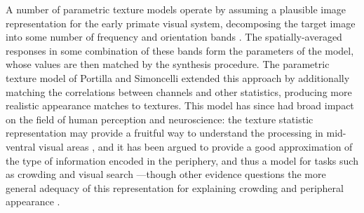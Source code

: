 \documentclass[doc, 11pt,a4paper,natbib]{apa6}\usepackage[]{graphicx}\usepackage[]{color}
\begin{document}
A number of parametric texture models operate by assuming a plausible image representation for the early primate visual system, decomposing the target image into some number of frequency and orientation bands \citep{cano_texture_1988, porat_localized_1989, malik_preattentive_1990, heeger_pyramidbased_1995, simoncelli_texture_1998, zhu_filters_1998, portilla_parametric_2000}.
The spatially-averaged responses in some combination of these bands form the parameters of the model, whose values are then matched by the synthesis procedure.
The parametric texture model of Portilla and Simoncelli \citep{portilla_parametric_2000, simoncelli_texture_1998} extended this approach by additionally matching the correlations between channels and other statistics, producing more realistic appearance matches to textures.
This model has since had broad impact on the field of human perception and neuroscience: the texture statistic representation may provide a fruitful way to understand the processing in mid-ventral visual areas
\citep{ziemba_selectivity_2016,movshon_representation_2014,freeman_functionally_2013,freeman_functional_2013,freeman_metamers_2011, okazawa_image_2015}, and it has been argued to provide a good approximation of the type of information encoded in the periphery, and thus a model for tasks such as crowding and visual search \citep[][]{freeman_metamers_2011, keshvari_pooling_2016,rosenholtz_rethinking_2012,balas_summary-statistic_2009,rosenholtz_summary_2012,rosenholtz_what_2011}---though other evidence questions the more general adequacy of this representation for explaining crowding and peripheral appearance \citep{agaoglu_can_2016, clarke_visual_2014, herzog_crowding_2015, wallis_testing_2016}.
\end{document}
